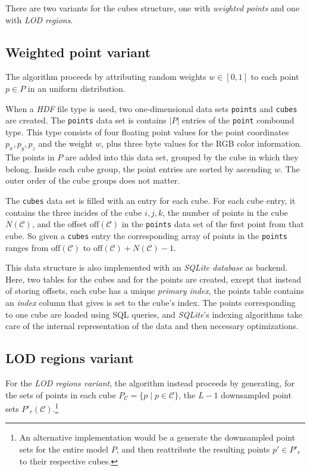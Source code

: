 \documentclass[a4paper,10pt,abstracton,notitlepage]{scrreprt}
\begin{document}
There are two variants for the cubes structure, one with \emph{weighted points} and one with \emph{LOD regions}. 

\subsection{Weighted point variant}
The algorithm proceeds by attributing random weights $w \in [0,1]$ to each point $p \in P$ in an uniform distribution.

When a \emph{HDF} file type is used, two one-dimensional data sets \texttt{points} and \texttt{cubes} are created. The \texttt{points} data set is contains $|P|$ entries of the \texttt{point} combound type. This type consists of four floating point values for the point coordinates $p_{x}, p_{y}, p_{z}$ and the weight $w$, plus three byte values for the RGB color information. The points in $P$ are added into this data set, grouped by the cube in which they belong. Inside each cube group, the point entries are sorted by ascending $w$. The outer order of the cube groups does not matter.

The \texttt{cubes} data set is filled with an entry for each cube. For each cube entry, it contains the three incides of the cube $i, j, k$, the number of points in the cube $N(\mathcal{C})$, and the offset $\text{off}(\mathcal{C})$ in the \texttt{points} data set of the first point from that cube. So given a \texttt{cubes} entry the corresponding array of points in the \texttt{points} ranges from $\text{off}(\mathcal{C})$ to $\text{off}(\mathcal{C}) + N(\mathcal{C}) - 1$.

This data structure is also implemented with an \emph{SQLite database} as backend. Here, two tables for the cubes and for the points are created, except that instead of storing offsets, each cube has a unique \emph{primary index}, the points table contains an \emph{index} column that gives is set to the cube's index. The points corresponding to one cube are loaded using SQL queries, and \emph{SQLite}'s indexing algorithms take care of the internal representation of the data and then necessary optimizations.

\subsection{LOD regions variant}
For the \emph{LOD regions variant}, the algorithm instead proceeds by generating, for the sets of points in each cube $P_{\mathcal{C}} = \{ p \mid p \in \mathcal{C} \}$, the $L-1$ downsampled point sets $P'_{r}(\mathcal{C})$.\footnote{An alternative implementation would be a generate the downsampled point sets for the entire model $P$, and then reattribute the resulting points $p' \in P'_{r}$ to their respective cubes.}
\end{document}
